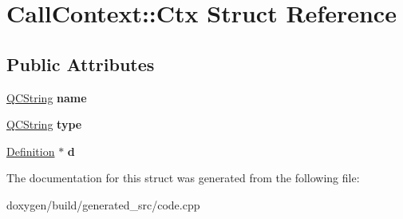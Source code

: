 \hypertarget{struct_call_context_1_1_ctx}{}\section{Call\+Context\+::Ctx Struct Reference}
\label{struct_call_context_1_1_ctx}
\subsection*{Public Attributes}
\begin{DoxyCompactItemize}
\item 
\mbox{\label{struct_call_context_1_1_ctx_a25706b50d9a1377bc3c8d955047ad4fc}} 
\mbox{\hyperlink{class_q_c_string}{Q\+C\+String}} {\bfseries name}
\item 
\mbox{\label{struct_call_context_1_1_ctx_a4f7150e244df309082ff5cc1abb0806f}} 
\mbox{\hyperlink{class_q_c_string}{Q\+C\+String}} {\bfseries type}
\item 
\mbox{\label{struct_call_context_1_1_ctx_aa400baafdc56c3d1f6aad8bbf8baceab}} 
\mbox{\hyperlink{class_definition}{Definition}} $\ast$ {\bfseries d}
\end{DoxyCompactItemize}


The documentation for this struct was generated from the following file\+:\begin{DoxyCompactItemize}
\item 
doxygen/build/generated\+\_\+src/code.\+cpp\end{DoxyCompactItemize}
